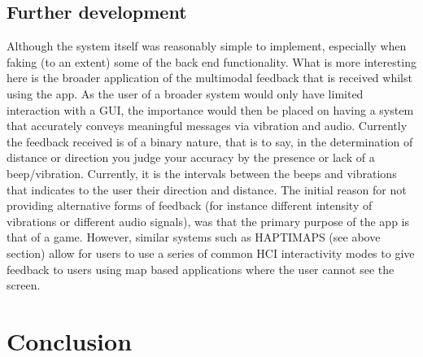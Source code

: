 \documentclass[12pt]{article} %
\begin{document}
\subsection{Further development}                                                                   
\label{FurtherDevelopment}           
Although the system itself was reasonably simple to implement, especially when faking (to an extent)
some of the back end functionality. What is more interesting here is the broader application of the
multimodal feedback that is received whilst using the app. As the user of a broader system would
only have limited interaction with a GUI, the importance would then be placed on having a system
that accurately conveys meaningful messages via vibration and audio. Currently the feedback
received is of a binary nature, that is to say, in the determination of distance or direction you
judge your accuracy by the presence or lack of a beep/vibration. Currently, it is the intervals
between the beeps and vibrations that indicates to the user their direction and distance. The
initial reason for not providing alternative forms of feedback (for instance different intensity of
vibrations or different audio signals), was that the primary purpose of the app is that of a game.
However, similar systems such as HAPTIMAPS (see above section) allow for users to use a series of
common HCI interactivity modes to give feedback to users using map based applications where the
user cannot see the screen.

\newpage
\section{Conclusion} %



 

\end{document}
